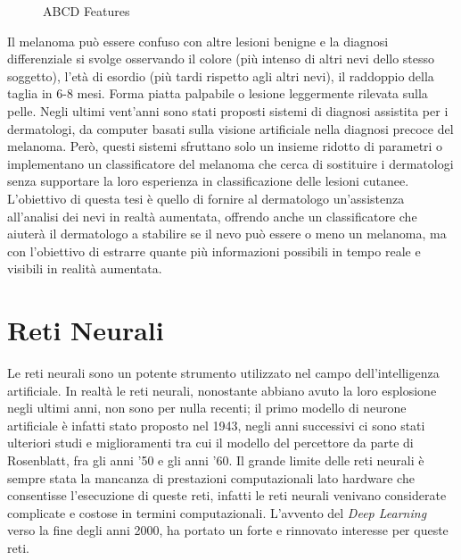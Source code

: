 {\begin{figure}[h]
\begin{center}
	\end{center}
	\caption{ABCD Features}	
\end{figure}
Il melanoma può essere confuso con altre lesioni benigne e la diagnosi differenziale si svolge osservando il colore (più intenso di
 altri nevi dello stesso soggetto), l'età di esordio (più tardi
rispetto agli altri nevi), il raddoppio della taglia in 6-8 mesi.
\newline
Forma piatta palpabile o lesione leggermente rilevata sulla pelle.
\newline
Negli ultimi vent'anni sono stati proposti sistemi di diagnosi assistita per i dermatologi, da computer basati sulla visione artificiale nella diagnosi precoce del melanoma.
 Però, questi sistemi sfruttano solo un insieme ridotto di parametri o implementano un classificatore del melanoma che cerca di sostituire i dermatologi senza supportare la loro esperienza in
classificazione delle lesioni cutanee.
\newline
L'obiettivo di questa tesi è quello di fornire al dermatologo un'assistenza all'analisi dei nevi in realtà aumentata, offrendo anche un classificatore che aiuterà il dermatologo a stabilire se il nevo può essere o meno un melanoma, ma con l'obiettivo di estrarre quante più informazioni possibili in tempo reale e visibili in realità aumentata.
\newpage
\section{Reti Neurali}
Le reti neurali sono un potente strumento utilizzato nel campo dell'intelligenza artificiale.
In realtà le reti neurali, nonostante abbiano avuto la loro esplosione negli ultimi anni, non sono per nulla recenti; il primo modello di neurone artificiale è infatti stato proposto nel 1943, negli anni successivi ci sono stati ulteriori studi e miglioramenti tra cui il modello del percettore da parte di Rosenblatt, fra gli anni '50 e gli anni '60. 
Il grande limite delle reti neurali è sempre stata la mancanza di prestazioni computazionali lato hardware che consentisse l'esecuzione di queste reti, infatti le reti neurali venivano considerate complicate e costose in termini computazionali.
\newline
L'avvento del \textit{Deep Learning} verso la fine degli anni 2000, ha portato un forte e rinnovato interesse per queste reti. \cite{maiani2016applicazioni}
\newline
}
